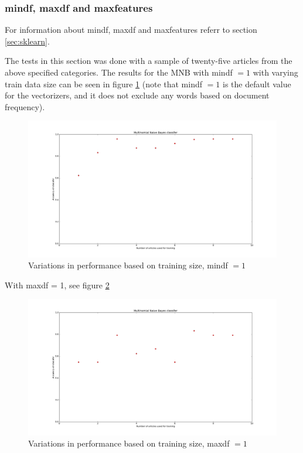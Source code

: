 \documentclass[a4paper]{article}
\begin{document}
\subsubsection{min\textunderscore df, max\textunderscore df and max\textunderscore features}
\label{sec:parameters}
For information about min\textunderscore df, max\textunderscore df and max\textunderscore features referr to section \ref{sec:sklearn}.

\noindent The tests in this section was done with a sample of twenty-five articles from the above specified categories.
\noindent The results for the MNB with min\textunderscore df $= 1$ with varying train data size can be seen in figure \ref{fig:MNB_first} (note that min\textunderscore df $= 1$ is the default value for the vectorizers, and it does not exclude any words based on document frequency). 
\begin{figure}[h!]
  \centering
    \includegraphics[width=1.0\textwidth]{MNB_first}
  \caption{Variations in performance based on training size, min\textunderscore df $ = 1$}
  \label{fig:MNB_first}
\end{figure}
\vspace{3mm}

\noindent With max\textunderscore df = 1, see figure \ref{fig:MNB_second}

\begin{figure}[h!]
  \centering
    \includegraphics[width=1.0\textwidth]{MNB_second}
  \caption{Variations in performance based on training size, max\textunderscore df $ = 1$}
  \label{fig:MNB_second}
\end{figure}
\end{document}
